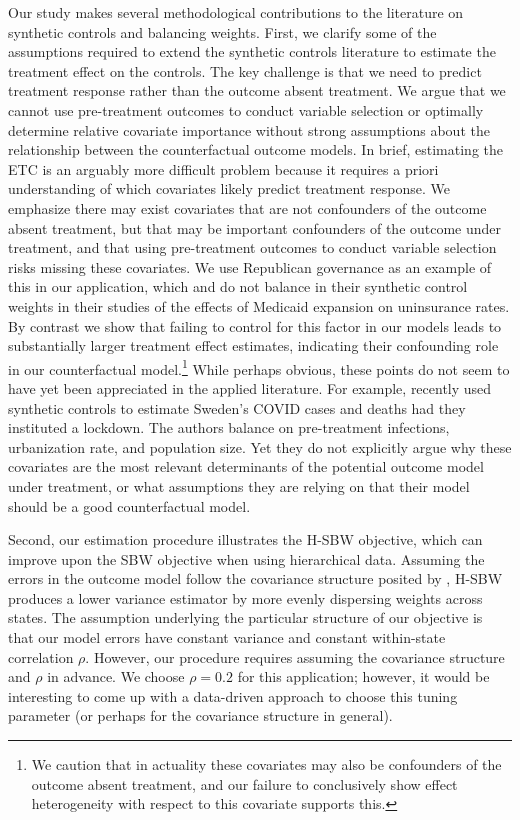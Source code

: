 Our study makes several methodological contributions to the literature on synthetic controls and balancing weights. First, we clarify some of the assumptions required to extend the synthetic controls literature to estimate the treatment effect on the controls. The key challenge is that we need to predict treatment response rather than the outcome absent treatment. We argue that we cannot use pre-treatment outcomes to conduct variable selection or optimally determine relative covariate importance without strong assumptions about the relationship between the counterfactual outcome models. In brief, estimating the ETC is an arguably more difficult problem because it requires a priori understanding of which covariates likely predict treatment response. We emphasize there may exist covariates that are not confounders of the outcome absent treatment, but that may be important confounders of the outcome under treatment, and that using pre-treatment outcomes to conduct variable selection risks missing these covariates. We use Republican governance as an example of this in our application, which \cite{kaestner2017effects} and \cite{courtemanche2017early} do not balance in their synthetic control weights in their studies of the effects of Medicaid expansion on uninsurance rates. By contrast we show that failing to control for this factor in our models leads to substantially larger treatment effect estimates, indicating their confounding role in our counterfactual model.\footnote{We caution that in actuality these covariates may also be confounders of the outcome absent treatment, and our failure to conclusively show effect heterogeneity with respect to this covariate supports this.} While perhaps obvious, these points do not seem to have yet been appreciated in the applied literature. For example, \cite{born2020lockdowns} recently used synthetic controls to estimate Sweden's COVID cases and deaths had they instituted a lockdown. The authors balance on pre-treatment infections, urbanization rate, and population size. Yet they do not explicitly argue why these covariates are the most relevant determinants of the potential outcome model under treatment, or what assumptions they are relying on that their model should be a good counterfactual model.

Second, our estimation procedure illustrates the H-SBW objective, which can improve upon the SBW objective when using hierarchical data. Assuming the errors in the outcome model follow the covariance structure posited by \cite{kloek1981ols}, H-SBW produces a lower variance estimator by more evenly dispersing weights across states. The assumption underlying the particular structure of our objective is that our model errors have constant variance and constant within-state correlation $\rho$. However, our procedure requires assuming the covariance structure and $\rho$ in advance. We choose $\rho = 0.2$ for this application; however, it would be interesting to come up with a data-driven approach to choose this tuning parameter (or perhaps for the covariance structure in general). 

